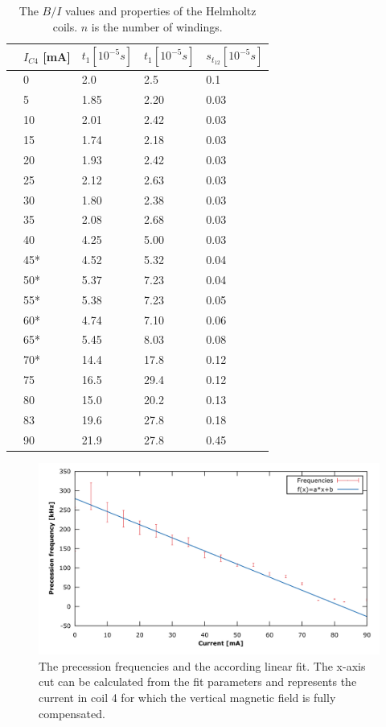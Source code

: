 \begin{table}
	\centering
	\begin{tabular}{@{}lllll@{}}
		\toprule
		&$I_{C4}$ [mA] &$\unit{t_1}{[10^{-5}s]}$ &$\unit{t_1}{[10^{-5}s]}$&$\unit{s_{t_{12}}}{[10^{-5}s]}$\\ 
		\midrule
		&0&2.0&2.5&0.1			\\
		&5&1.85&2.20&0.03		\\
		&10&2.01&2.42&0.03		\\
		&15&1.74&2.18&0.03		\\
		&20&1.93&2.42&0.03		\\
		&25&2.12&2.63&0.03		\\
		&30&1.80&2.38&0.03		\\
		&35&2.08&2.68&0.03		\\
		&40&4.25&5.00&0.03		\\
		&45*&4.52&5.32&0.04		\\
		&50*&5.37&7.23&0.04		\\
		&55*&5.38&7.23&0.05		\\
		&60*&4.74&7.10&0.06		\\
		&65*&5.45&8.03&0.08		\\
		&70*&14.4&17.8&0.12		\\
		&75&16.5&29.4&0.12		\\
		&80&15.0&20.2&0.13		\\
		&83&19.6&27.8&0.18		\\
		&90&21.9&27.8&0.45		\\
		\bottomrule
	\end{tabular}
	\caption[Properties of the magnetic field coils]{The $B/I$ values and properties of the Helmholtz coils. $n$ is the number of windings. \cite{anleitung}}
	\label{tb:precessionpeaks}
\end{table}
\begin{figure}
\centering
\includegraphics[width=1.0\linewidth]{graphics/freqlinfit}
\caption[Linear fit on precession frequencies]{The precession frequencies and the according linear fit. The x-axis cut can be calculated from the fit parameters and represents the current in coil 4 for which the vertical magnetic field is fully compensated.}
\label{fig:freqlinfit}
\end{figure}
